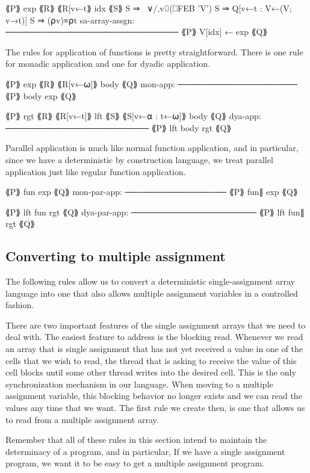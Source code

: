                 ⟪P⟫ exp ⟪R⟫
                ⟪R[v←t⟫ idx ⟪S⟫
                S ⇒ ~∨/,v⌷(⎕FEB 'V')
                S ⇒ Q[v←t : V←(V; v→t)]
                S ⇒ (⍴v)≡⍴t
sa-array-assgn: ─────────────────────────────
                ⟪P⟫ V[idx] ← exp ⟪Q⟫


The rules for application of functions is pretty straightforward.
There is one rule for monadic application and one for dyadic 
application.

         ⟪P⟫ exp ⟪R⟫
         ⟪R[v←⍵]⟫ body ⟪Q⟫
mon-app: ────────────────────
         ⟪P⟫ { body } exp ⟪Q⟫

         ⟪P⟫ rgt ⟪R⟫
         ⟪R[v←t]⟫ lft ⟪S⟫
         ⟪S[v←⍺ : t←⍵]⟫ body ⟪Q⟫
dya-app: ────────────────────────
         ⟪P⟫ lft {body} rgt ⟪Q⟫

Parallel application is much like normal function application, 
and in particular, since we have a deterministic by construction
language, we treat parallel application just like regular function
application.

             ⟪P⟫ fun exp ⟪Q⟫
mon-par-app: ─────────────────
             ⟪P⟫ fun∥ exp ⟪Q⟫

             ⟪P⟫ lft fun rgt ⟪Q⟫
dya-par-app: ─────────────────────
             ⟪P⟫ lft fun∥ rgt ⟪Q⟫

\subsection{Converting to multiple assignment}

The following rules allow us to convert a deterministic 
single-assignment array language into one that also allows 
multiple assignment variables in a controlled fashion.

There are two important features of the single assignment 
arrays that we need to deal with. The easiest feature to 
address is the blocking read. Whenever we read an array 
that is single assignment that has not yet received a value 
in one of the cells that we wish to read, the thread that 
is asking to receive the value of this cell blocks until 
some other thread writes into the desired cell. This is 
the only synchronization mechanism in our language. 
When moving to a multiple assignment variable, this 
blocking behavior no longer exists and we can read the values any 
time that we want. The first rule we create then, is one 
that allows us to read from a multiple assignment array. 

Remember that all of these rules in this section intend 
to maintain the determinacy of a program, and in particular, 
If we have a single assignment program, we want it to be 
easy to get a multiple assignment program. 

